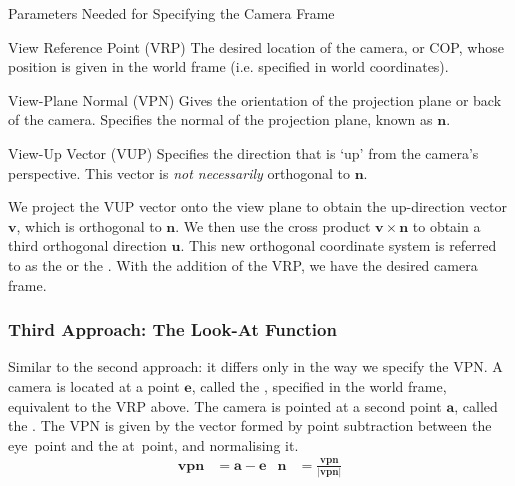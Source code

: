 \documentclass[../COS3712_Notes.tex]{subfiles}
\begin{document}
          \begin{sidenote}{Parameters Needed for Specifying the Camera Frame}
            $ $\vspace{-1em}
            \begin{descriptimize}
              \item[View Reference Point (VRP)] The desired location of the camera, or COP,
                whose position is given in the world frame
                (i.e. specified in world coordinates).
              \item[View-Plane Normal (VPN)] Gives the orientation of the projection plane
                or back of the camera.
                Specifies the normal of the projection plane, known as $\mathbf{n}$.
              \item[View-Up Vector (VUP)] Specifies the direction that is `up' from the
                camera's perspective.
                This vector is \emph{not necessarily} orthogonal to $\mathbf{n}$.
            \end{descriptimize}
          \end{sidenote}

          We project the VUP vector onto the view plane to obtain the up-direction vector
          $\mathbf{v}$, which is orthogonal to $\mathbf{n}$.
          We then use the cross product $\mathbf{v} \times \mathbf{n}$ to obtain
          a third orthogonal direction $\mathbf{u}$.
          This new orthogonal coordinate system is referred to as the
           or the .
          With the addition of the VRP, we have the desired camera frame.

        \subsubsection{Third Approach: The Look-At Function}
          Similar to the second approach: it differs only in the way we specify the VPN.
          A camera is located at a point $\mathbf{e}$, called the ,
          specified in the world frame, equivalent to the VRP above.
          The camera is pointed at a second point $\mathbf{a}$, called the .
          The VPN is given by the vector formed by point subtraction between the eye~point
          and the at~point, and normalising it.
          \begin{align*}
            \mathbf{vpn} &= \mathbf{a} - \mathbf{e} &
            \mathbf{n} &= \frac{\mathbf{vpn}}{\lvert \mathbf{vpn} \rvert}
          \end{align*}
\end{document}

